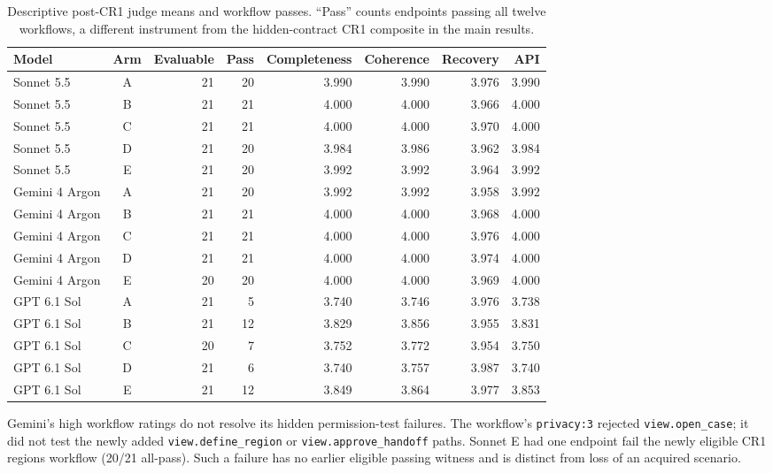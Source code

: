 \begin{table}[!htbp]
\centering\footnotesize
\setlength{\tabcolsep}{4pt}
\caption{Descriptive post-CR1 judge means and workflow passes. ``Pass''
counts endpoints passing all twelve workflows, a different instrument
from the hidden-contract CR1 composite in the main results.}\label{tab:resultsjudgemeanscr1}

\begin{tabular*}{\textwidth}{@{\extracolsep{\fill}}lcrrrrrr@{}}
\toprule
Model & Arm & Evaluable & Pass & Completeness & Coherence & Recovery & API \\
\midrule
Sonnet 5.5 & A & 21 & 20 & 3.990 & 3.990 & 3.976 & 3.990 \\
Sonnet 5.5 & B & 21 & 21 & 4.000 & 4.000 & 3.966 & 4.000 \\
Sonnet 5.5 & C & 21 & 21 & 4.000 & 4.000 & 3.970 & 4.000 \\
Sonnet 5.5 & D & 21 & 20 & 3.984 & 3.986 & 3.962 & 3.984 \\
Sonnet 5.5 & E & 21 & 20 & 3.992 & 3.992 & 3.964 & 3.992 \\
\midrule
Gemini 4 Argon & A & 21 & 20 & 3.992 & 3.992 & 3.958 & 3.992 \\
Gemini 4 Argon & B & 21 & 21 & 4.000 & 4.000 & 3.968 & 4.000 \\
Gemini 4 Argon & C & 21 & 21 & 4.000 & 4.000 & 3.976 & 4.000 \\
Gemini 4 Argon & D & 21 & 21 & 4.000 & 4.000 & 3.974 & 4.000 \\
Gemini 4 Argon & E & 20 & 20 & 4.000 & 4.000 & 3.969 & 4.000 \\
\midrule
GPT 6.1 Sol & A & 21 & 5 & 3.740 & 3.746 & 3.976 & 3.738 \\
GPT 6.1 Sol & B & 21 & 12 & 3.829 & 3.856 & 3.955 & 3.831 \\
GPT 6.1 Sol & C & 20 & 7 & 3.752 & 3.772 & 3.954 & 3.750 \\
GPT 6.1 Sol & D & 21 & 6 & 3.740 & 3.757 & 3.987 & 3.740 \\
GPT 6.1 Sol & E & 21 & 12 & 3.849 & 3.864 & 3.977 & 3.853 \\
\bottomrule
\end{tabular*}
\end{table}

\FloatBarrier
Gemini's high workflow ratings do not resolve its hidden permission-test
failures. The workflow's \nolinkurl{privacy:3} rejected
\nolinkurl{view.open_case}; it did not test the newly added
\nolinkurl{view.define_region} or \nolinkurl{view.approve_handoff} paths.
Sonnet E had one endpoint fail the newly eligible CR1 regions workflow
(20/21 all-pass). Such a failure has no earlier eligible passing witness
and is distinct from loss of an acquired scenario.

